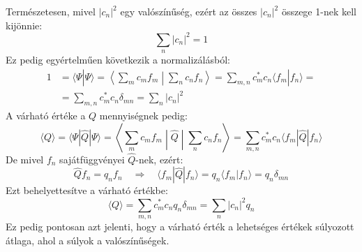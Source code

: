 \documentclass[../main.tex]{subfiles}
\begin{document}
Természetesen, mivel $|c_n|^2$ egy valószínűség, ezért az összes $|c_n|^2$ összege 1-nek kell kijönnie:
\begin{equation}
    \sum_n |c_n|^2 = 1
\end{equation}
Ez pedig egyértelműen következik a normalizálásból:
\begin{equation}
    \begin{aligned}
    1 &= \langle \Psi | \Psi \rangle = \left\langle \sum_m c_m f_m \middle| \sum_n c_n f_n \right\rangle = \sum_{m,n} c_m^* c_n \langle f_m | f_n \rangle = \\
    &= \sum_{m,n} c_m^* c_n \delta_{mn} = \sum_n |c_n|^2
    \end{aligned}
\end{equation}
A várható értéke a $Q$ mennyiségnek pedig:
\begin{equation}
    \langle Q \rangle = \langle \Psi | \hat{Q} | \Psi \rangle = \left\langle \sum_m c_m f_m \middle| \hat{Q} \middle| \sum_n c_n f_n \right\rangle = \sum_{m,n} c_m^* c_n \langle f_m | \hat{Q} | f_n \rangle
\end{equation}
De mivel $f_n$ sajátfüggvényei $\hat{Q}$-nek, ezért:
\begin{equation}
    \hat{Q} f_n = q_n f_n \quad \Rightarrow \quad \langle f_m | \hat{Q} | f_n \rangle = q_n \langle f_m | f_n \rangle = q_n \delta_{mn}
\end{equation}
Ezt behelyettesítve a várható értékbe:
\begin{equation}
    \langle Q \rangle = \sum_{m,n} c_m^* c_n q_n \delta_{mn} = \sum_n |c_n|^2 q_n
\end{equation}
Ez pedig pontosan azt jelenti, hogy a várható érték a lehetséges értékek súlyozott átlaga, ahol a súlyok a valószínűségek.
\end{document}
